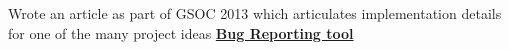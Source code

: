 \documentclass[]{deedy-resume-openfont}
\begin{document}
\begin{minipage}[t]{0.66\textwidth}
\descript{}
\begin{tightemize}
\item Wrote an article as part of GSOC 2013 which articulates implementation
  details for one of the many project ideas
  \href{http://swlogs.me/blog/gsoc-2013/}{\textbf{Bug Reporting tool}}
\end{tightemize}
\sectionsep
%


\end{minipage}
\end{document}
